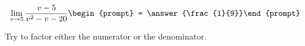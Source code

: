 \documentclass{ximera}
\author{Bart Snapp}
\begin{document}
\begin{exercise}

\[
\lim_{v\to 5 } \frac{v-5}{v^2-v-20}\begin{prompt} = \answer{\frac{1}{9}}\end{prompt}
\]
\begin{hint}
Try to factor either the numerator or the denominator.
\end{hint}
\end{exercise}
\end{document}
